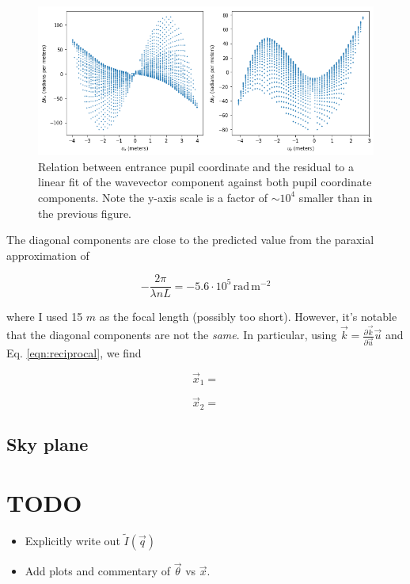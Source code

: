 \documentclass{article}
\begin{document}
\begin{figure}
    \includegraphics[scale=0.7]{dku.png}

    \caption{Relation between entrance pupil coordinate and the residual to a linear fit of the
    wavevector component against both pupil coordinate components.  Note the y-axis scale is a
    factor of $\sim 10^4$ smaller than in the previous figure.}

    \label{fig:dku}
\end{figure}

The diagonal components are close to the predicted value from the paraxial approximation of

\begin{equation}
    -\frac{2 \pi}{\lambda n L} = -5.6 \cdot 10^5 \mathrm{\,rad\,m^{-2}}
\end{equation}

where I used 15 $m$ as the focal length (possibly too short).  However, it's notable that the
diagonal components are not the \textit{same}.  In particular, using $\vec{k} = \frac{\partial
\vec{k}}{\partial \vec{u}} \vec{u}$ and Eq. \ref{eqn:reciprocal}, we find

\begin{equation}
    \vec{x}_1 =
\end{equation}

\begin{equation}
    \vec{x}_2 =
\end{equation}

\subsection{Sky plane}



\section{TODO}

\begin{itemize}
    \item Explicitly write out $\tilde{I}\left(\vec{q}\right)$
    \item Add plots and commentary of $\vec{\theta}$ vs $\vec{x}$.
\end{itemize}
\end{document}
